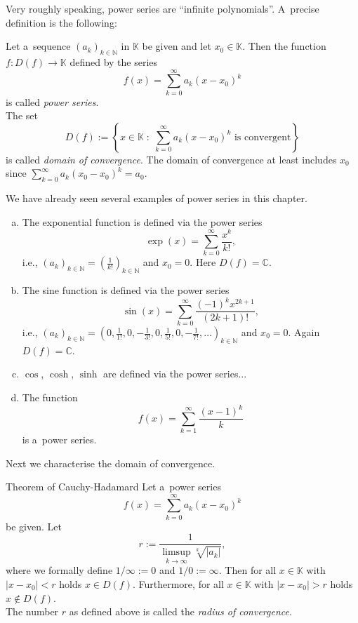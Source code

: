 

Very roughly speaking, power series are ``infinite polynomials''. A~precise definition is the following:
\begin{Definition}{}
Let a~sequence $(a_k)_{k\in\mathbb{N}}$ in $\mathbb{K}$ be given and let $x_0\in\mathbb{K}$. Then the function $f:D(f)\to\mathbb{K}$ defined by the series
\[f(x)=\sum_{k=0}^\infty a_k(x-x_0)^k\]
is called \emph{power series}.\\
The set
\[D(f):=\left\{x\in\mathbb{K}\;:\;\sum_{k=0}^\infty a_k(x-x_{0})^k\text{ is convergent}\right\}\]
is called \emph{domain of convergence}.  The domain of convergence at least includes $x_{0}$ since $\sum_{k=0}^\infty a_k(x_{0}-x_{0})^k=a_{0}$.
\end{Definition}
We have already seen several examples of power series in this chapter.
\begin{example}\label{ex:powser}
\begin{enumerate}[a)]
\item The exponential function is defined via the power series
\[\exp(x)=\sum_{k=0}^\infty\frac{x^k}{k!},\]
i.e., $(a_k)_{k\in\mathbb{N}}=(\frac{1}{k!})_{k\in\mathbb{N}}$ and $x_0=0$. Here $D(f)=\mathbb{C}$.
\item The sine function is defined via the power series
\[\sin(x)=\sum_{k=0}^\infty\frac{(-1)^kx^{2k+1}}{(2k+1)!},\]
i.e., $(a_k)_{k\in\mathbb{N}}=(0,\frac{1}{1!},0,-\frac{1}{3!},0,\frac{1}{5!},0,-\frac{1}{7!},\ldots)_{k\in\mathbb{N}}$ and $x_0=0$.
Again $D(f)=\mathbb{C}$.
\item $\cos$, $\cosh$, $\sinh$ are defined via the power series...
\item The function
\[f(x)=\sum_{k=1}^\infty\frac{(x-1)^k}{k}\]
is a~power series.
\end{enumerate}
\end{example}

Next we characterise the domain of convergence.
\begin{Theorem}{Theorem of Cauchy-Hadamard}
Let a~power series
\[f(x)=\sum_{k=0}^\infty a_k(x-x_0)^k\]
be given. Let
\[r:=\frac1{\limsup\limits_{k \rightarrow \infty} \sqrt[k]{|a_k|}},\]
where we formally define $1/\infty:=0$ and $1/0:=\infty$. Then for all $x\in\mathbb{K}$ with $|x-x_0|<r$ holds $x\in D(f)$. Furthermore,
for all $x\in\mathbb{K}$ with $|x-x_0|>r$ holds $x\notin D(f)$.\\
The number $r$ as defined above is called the {\em radius of convergence}.
\end{Theorem}

